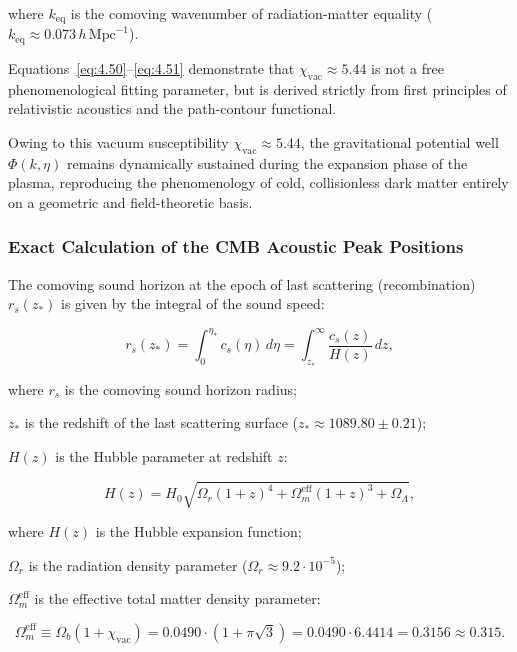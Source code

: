 where $k_{\text{eq}}$ is the comoving wavenumber of radiation-matter equality ($k_{\text{eq}} \approx 0.073\,h\,\text{Mpc}^{-1}$).

Equations~\eqref{eq:4.50}--\eqref{eq:4.51} demonstrate that $\chi_{\text{vac}} \approx 5.44$ is not a free phenomenological fitting parameter, but is derived strictly from first principles of relativistic acoustics and the path-contour functional.

Owing to this vacuum susceptibility $\chi_{\text{vac}} \approx 5.44$, the gravitational potential well $\Phi(k, \eta)$ remains dynamically sustained during the expansion phase of the plasma, reproducing the phenomenology of cold, collisionless dark matter entirely on a geometric and field-theoretic basis.


\subsubsection{Exact Calculation of the CMB Acoustic Peak Positions}\label{sec:4.4.3}

The comoving sound horizon at the epoch of last scattering (recombination) $r_s(z_*)$ is given by the integral of the sound speed:

\begin{equation}\label{eq:4.52}\tag{4.52}
r_s(z_*) = \int_0^{\eta_*} c_s(\eta) \, d\eta = \int_{z_*}^{\infty} \frac{c_s(z)}{H(z)} \, dz,
\end{equation}

where $r_s$ is the comoving sound horizon radius;  

$z_*$ is the redshift of the last scattering surface ($z_* \approx 1089.80 \pm 0.21$);  

$H(z)$ is the Hubble parameter at redshift $z$:

\begin{equation}\label{eq:4.53}\tag{4.53}
H(z) = H_0 \sqrt{\Omega_r (1+z)^4 + \Omega_m^{\text{eff}} (1+z)^3 + \Omega_\Lambda},
\end{equation}

where $H(z)$ is the Hubble expansion function;  

$\Omega_r$ is the radiation density parameter ($\Omega_r \approx 9.2 \cdot 10^{-5}$);  

$\Omega_m^{\text{eff}}$ is the effective total matter density parameter:

\begin{equation}\label{eq:4.54}\tag{4.54}
\Omega_m^{\text{eff}} \equiv \Omega_b (1 + \chi_{\text{vac}}) = 0.0490 \cdot (1 + \pi\sqrt{3}) = 0.0490 \cdot 6.4414 = \mathbf{0.3156} \approx \mathbf{0.315}.
\end{equation}

